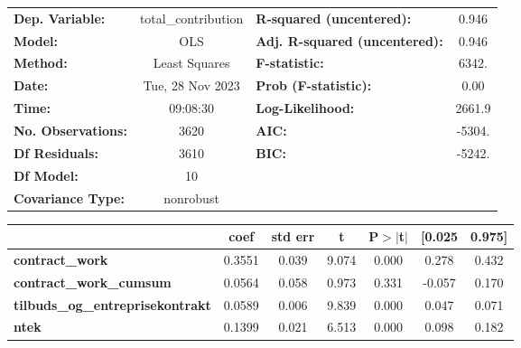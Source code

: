 \begin{center}
\begin{tabular}{lclc}
\toprule
\textbf{Dep. Variable:}                  & total\_contribution & \textbf{  R-squared (uncentered):}      &     0.946   \\
\textbf{Model:}                          &         OLS         & \textbf{  Adj. R-squared (uncentered):} &     0.946   \\
\textbf{Method:}                         &    Least Squares    & \textbf{  F-statistic:       }          &     6342.   \\
\textbf{Date:}                           &   Tue, 28 Nov 2023  & \textbf{  Prob (F-statistic):}          &     0.00    \\
\textbf{Time:}                           &       09:08:30      & \textbf{  Log-Likelihood:    }          &    2661.9   \\
\textbf{No. Observations:}               &          3620       & \textbf{  AIC:               }          &    -5304.   \\
\textbf{Df Residuals:}                   &          3610       & \textbf{  BIC:               }          &    -5242.   \\
\textbf{Df Model:}                       &            10       & \textbf{                     }          &             \\
\textbf{Covariance Type:}                &      nonrobust      & \textbf{                     }          &             \\
\bottomrule
\end{tabular}
\begin{tabular}{lcccccc}
                                         & \textbf{coef} & \textbf{std err} & \textbf{t} & \textbf{P$> |$t$|$} & \textbf{[0.025} & \textbf{0.975]}  \\
\midrule
\textbf{contract\_work}                  &       0.3551  &        0.039     &     9.074  &         0.000        &        0.278    &        0.432     \\
\textbf{contract\_work\_cumsum}          &       0.0564  &        0.058     &     0.973  &         0.331        &       -0.057    &        0.170     \\
\textbf{tilbuds\_og\_entreprisekontrakt} &       0.0589  &        0.006     &     9.839  &         0.000        &        0.047    &        0.071     \\
\textbf{ntek}                            &       0.1399  &        0.021     &     6.513  &         0.000        &        0.098    &        0.182     \\

\end{tabular}
\end{center}
